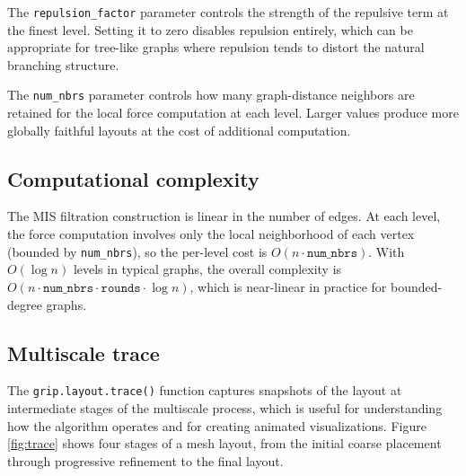 The \texttt{repulsion\_factor} parameter controls the strength of the repulsive term
at the finest level. Setting it to zero disables repulsion entirely, which
can be appropriate for tree-like graphs where repulsion tends to distort the
natural branching structure.

The \texttt{num\_nbrs} parameter controls how many graph-distance neighbors are
retained for the local force computation at each level. Larger values produce
more globally faithful layouts at the cost of additional computation.

\subsection{Computational complexity}\label{computational-complexity}

The MIS filtration construction is linear in the number of edges. At each
level, the force computation involves only the local neighborhood of each
vertex (bounded by \texttt{num\_nbrs}), so the per-level cost is \(O(n \cdot
\texttt{num\_nbrs})\). With \(O(\log n)\) levels in typical graphs, the overall
complexity is \(O(n \cdot \texttt{num\_nbrs} \cdot \texttt{rounds} \cdot \log
n)\), which is near-linear in practice for bounded-degree graphs.

\subsection{Multiscale trace}\label{multiscale-trace}

The \texttt{grip.layout.trace()} function captures snapshots of the layout at
intermediate stages of the multiscale process, which is useful for
understanding how the algorithm operates and for creating animated
visualizations. Figure \ref{fig:trace} shows four stages of a mesh layout,
from the initial coarse placement through progressive refinement to the
final layout.

